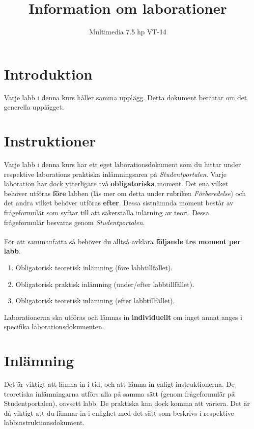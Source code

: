 \documentclass[12pt]{article}
\date{}
\title{ Information om laborationer }
\author{ Multimedia 7.5 hp VT-14 }
\begin{document}
\maketitle
\vspace{-2em}



\section{Introduktion}
Varje labb i denna kurs håller samma upplägg. Detta dokument berättar om det generella upplägget.

\section{Instruktioner}
Varje labb i denna kurs har ett eget laborationsdokument som du hittar under respektive laborations praktiska inlämningsarea på \emph{Studentportalen}. Varje laboration har dock ytterligare två \textbf{obligatoriska} moment. Det ena vilket behöver utföras \textbf{före} labben (läs mer om detta under rubriken \emph{Förberedelse}) och det andra vilket behöver utföras \textbf{efter}. Dessa sistnämnda moment består av frågeformulär som syftar till att säkerställa inlärning av teori. Dessa frågeformulär besvaras genom \emph{Studentportalen}.

  \paragraph{}
  För att sammanfatta så behöver du alltså avklara \textbf{följande tre moment per labb}.

  \begin{enumerate}
    \item Obligatorisk teoretisk inlämning (före labbtillfället).
    \item Obligatorisk praktisk inlämning (under/efter labbtillfället).
    \item Obligatorisk teoretisk inlämning (efter labbtillfället).
  \end{enumerate}

Laborationerna ska utföras och lämnas in \textbf{individuellt} om inget annat anges i specifika laborationsdokumenten.

\section{Inlämning}
Det är viktigt att lämna in i tid, och att lämna in enligt instruktionerna. De teoretiska inlämningarna utförs alla på samma sätt (genom frågeformulär på Studentportalen), oavsett labb. De praktiska kan dock komma att variera. Det är då viktigt att du lämnar in i enlighet med det sätt som beskrivs i respektive labbinstruktionsdokument.
\end{document}
